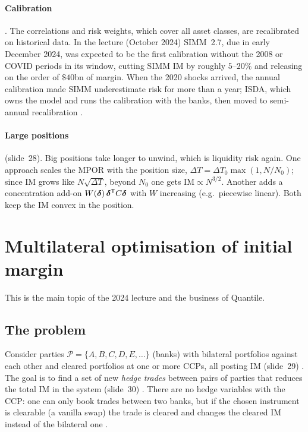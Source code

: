 \begin{paracol}{2}
\paragraph{Calibration} . The correlations and risk weights, which cover all asset classes, are
recalibrated on historical data. In the lecture (October 2024) SIMM~2.7, due in early December 2024, was expected to
be the first calibration without the 2008 or COVID periods in its window, cutting SIMM IM by roughly $5$--$20\%$
and releasing on the order of $\$40$bn of margin. When the 2020 shocks arrived, the annual calibration made SIMM
underestimate risk for more than a year; ISDA, which owns the model and runs the calibration with the banks, then
moved to semi-annual recalibration .

\paragraph{Large positions} (slide~28). Big positions take longer to unwind, which is liquidity risk again. One
approach scales the MPOR with the position size, $\Delta T=\Delta T_0\max(1,N/N_0)$; since IM grows like
$N\sqrt{\Delta T}$, beyond $N_0$ one gets $\mathrm{IM}\propto N^{3/2}$. Another adds a concentration add-on
$W(\bm\delta)\,\bm\delta^{\mathsf T} C\bm\delta$ with $W$ increasing (e.g.\ piecewise linear). Both keep the IM convex in the
position.

\section{Multilateral optimisation of initial margin}\label{ch08:sec-opt}
This is the main topic of the 2024 lecture and the business of Quantile.

\subsection{The problem}
Consider parties $\mathcal P=\{A,B,C,D,E,\dots\}$ (banks) with bilateral portfolios against each other and cleared
portfolios at one or more CCPs, all posting IM (slide~29) . The goal is to find a set of new
\emph{hedge trades} between pairs of parties that reduces the total IM in the system (slide~30)
. There are no hedge variables with the CCP: one can only book trades between two banks, but if
the chosen instrument is clearable (a vanilla swap) the trade is cleared and changes the cleared IM instead of the
bilateral one .


\end{paracol}
